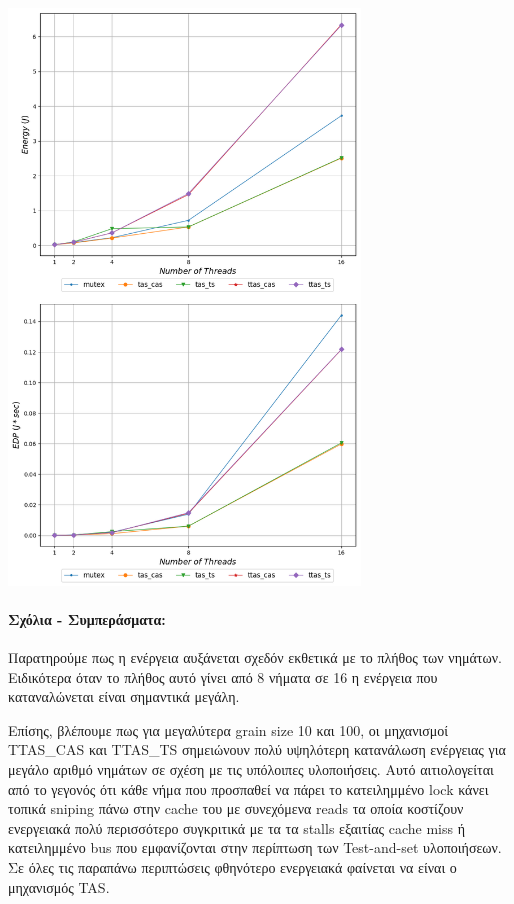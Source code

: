 \begin{minipage}{\textwidth}
   \begin{center}
      \\
      \vspace{3mm}
      \includegraphics[width=0.7\textwidth]{./graphs/sniper/energy/grain-100.png}
      \vspace{6mm}
   \end{center}
\end{minipage}

\paragraph{Σχόλια - Συμπεράσματα:}
Παρατηρούμε πως η ενέργεια αυξάνεται σχεδόν εκθετικά με το πλήθος των νημάτων.
Ειδικότερα όταν το πλήθος αυτό γίνει από 8 νήματα σε 16 η ενέργεια που καταναλώνεται
είναι σημαντικά μεγάλη. 

Επίσης, βλέπουμε πως για μεγαλύτερα grain size 10 και 100, οι μηχανισμοί
TTAS\_CAS και TTAS\_TS σημειώνουν πολύ υψηλότερη κατανάλωση ενέργειας για μεγάλο
αριθμό νημάτων σε σχέση με τις υπόλοιπες υλοποιήσεις. Αυτό αιτιολογείται από το
γεγονός ότι κάθε νήμα που προσπαθεί να πάρει το κατειλημμένο lock κάνει τοπικά
sniping πάνω στην cache του με συνεχόμενα reads τα οποία κοστίζουν ενεργειακά
πολύ περισσότερο συγκριτικά με τα τα stalls εξαιτίας cache miss ή κατειλημμένο
bus που εμφανίζονται στην περίπτωση των Test-and-set υλοποιήσεων. Σε όλες τις
παραπάνω περιπτώσεις φθηνότερο ενεργειακά φαίνεται να είναι ο μηχανισμός TAS.

